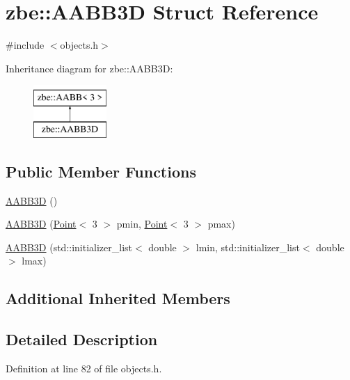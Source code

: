 \hypertarget{structzbe_1_1_a_a_b_b3_d}{}\section{zbe\+:\+:A\+A\+B\+B3\+D Struct Reference}
\label{structzbe_1_1_a_a_b_b3_d}


{\ttfamily \#include $<$objects.\+h$>$}

Inheritance diagram for zbe\+:\+:A\+A\+B\+B3\+D\+:\begin{figure}[H]
\begin{center}
\leavevmode
\includegraphics[height=2.000000cm]{structzbe_1_1_a_a_b_b3_d}
\end{center}
\end{figure}
\subsection*{Public Member Functions}
\begin{DoxyCompactItemize}
\item 
\hyperlink{structzbe_1_1_a_a_b_b3_d_a1ebf6148bbf48402f7646bb9a15b3669}{A\+A\+B\+B3\+D} ()
\item 
\hyperlink{structzbe_1_1_a_a_b_b3_d_a18340286ab0e01f06db7b181291b4ce0}{A\+A\+B\+B3\+D} (\hyperlink{classzbe_1_1_point}{Point}$<$ 3 $>$ pmin, \hyperlink{classzbe_1_1_point}{Point}$<$ 3 $>$ pmax)
\item 
\hyperlink{structzbe_1_1_a_a_b_b3_d_ab752e4a199de0f88944285acc9b3d878}{A\+A\+B\+B3\+D} (std\+::initializer\+\_\+list$<$ double $>$ lmin, std\+::initializer\+\_\+list$<$ double $>$ lmax)
\end{DoxyCompactItemize}
\subsection*{Additional Inherited Members}


\subsection{Detailed Description}


Definition at line 82 of file objects.\+h.



